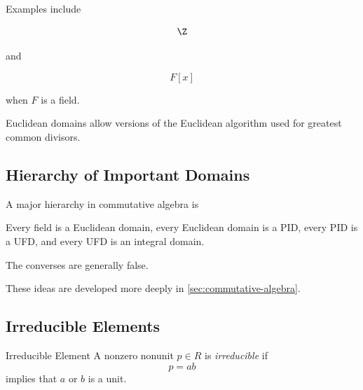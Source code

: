 Examples include

\[ \Z \]

and

\[ F[x] \]

when \(F\) is a field.

Euclidean domains allow versions of the Euclidean algorithm used for greatest
common divisors.

\subsection{Hierarchy of Important Domains}
\label{subsec:domain-hierarchy}

A major hierarchy in commutative algebra is

\begin{center}
\end{center}

Every field is a Euclidean domain, every Euclidean domain is a PID, every PID
is a UFD, and every UFD is an integral domain.

The converses are generally false.

These ideas are developed more deeply in
\cref{sec:commutative-algebra}.

\subsection{Irreducible Elements}
\label{subsec:irreducible-elements}

\begin{definitionbox}{Irreducible Element}
A nonzero nonunit \(p\in R\) is \emph{irreducible} if
\[ p=ab \]
implies that \(a\) or \(b\) is a unit.
\end{definitionbox}

